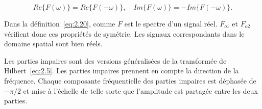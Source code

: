\begin{equation}
    Re\{F(\omega)\} = Re\{F(-\omega)\}, \quad Im\{F(\omega)\} = -Im\{F(-\omega)\}.
\end{equation}

Dans la définition~\ref{eq:2.20}, comme $F$ est le spectre d'un signal réel. $F_{o1}$ et $F_{o2}$ vérifient donc ces propriétés de symétrie. Les signaux correspondants dans le domaine spatial sont bien réels.

\bigskip

Les parties impaires sont des versions généralisées de la transformée de Hilbert~\ref{eq:2.5}. Les parties impaires prennent en compte la direction de la fréquence. Chaque composante fréquentielle des parties impaires est déphasée de $-\pi/2$ et mise à l'échelle de telle sorte que l'amplitude est partagée entre les deux parties.

\bigskip

